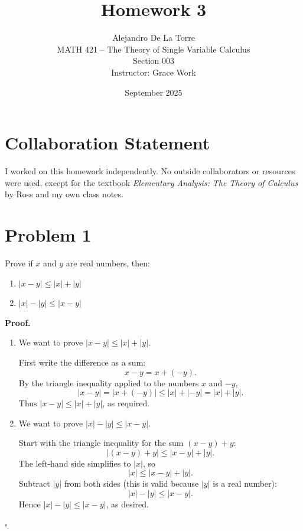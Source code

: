 \documentclass[12pt]{article}
\title{Homework 3}
\author{Alejandro De La Torre \\ MATH 421 -- The Theory of Single Variable Calculus \\ Section 003 \\ Instructor: Grace Work}
\date{September 2025}
\begin{document}
\maketitle

\section*{Collaboration Statement}
I worked on this homework independently. No outside collaborators or resources were used, except for the textbook \textit{Elementary Analysis: The Theory of Calculus} by Ross and my own class notes. 

\section*{Problem 1}
Prove if $x$ and $y$ are real numbers, then:
\begin{enumerate}[label=\Alph*.]
  \item $|x-y| \le |x| + |y|$
  \item $|x| - |y| \le |x-y|$
\end{enumerate}

\textbf{Proof.}

\begin{enumerate}[label=\Alph*.]
\item We want to prove $|x-y| \le |x| + |y|$.

First write the difference as a sum:
\[
x-y = x + (-y).
\]
By the triangle inequality applied to the numbers $x$ and $-y$,
\[
|x-y|
= |x + (-y)|
\le |x| + |-y|
= |x| + |y|.
\]
Thus $|x-y| \le |x| + |y|$, as required.

\item We want to prove $|x| - |y| \le |x-y|$.

Start with the triangle inequality for the sum $(x-y)+y$:
\[
|(x-y)+y| \le |x-y| + |y|.
\]
The left-hand side simplifies to $|x|$, so
\[
|x| \le |x-y| + |y|.
\]
Subtract $|y|$ from both sides (this is valid because $|y|$ is a real number):
\[
|x| - |y| \le |x-y|.
\]
Hence $|x| - |y| \le |x-y|$, as desired.
\end{enumerate}
\hfill$\square$
\end{document}
